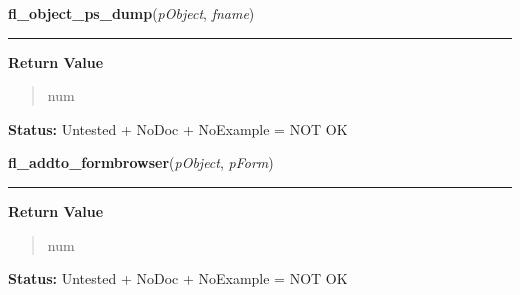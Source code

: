     \vspace{0.5ex}

\hspace{.8\funcindent}\begin{boxedminipage}{\funcwidth}

    \raggedright \textbf{fl\_object\_ps\_dump}(\textit{pObject}, \textit{fname})

    \vspace{-1.5ex}

    \rule{\textwidth}{0.5\fboxrule}
\setlength{\parskip}{2ex}
\setlength{\parskip}{1ex}
      \textbf{Return Value}
    \vspace{-1ex}

      \begin{quote}
      num

      \end{quote}

\textbf{Status:} Untested + NoDoc + NoExample = NOT OK



    \end{boxedminipage}

    \label{xformslib:library:fl_addto_formbrowser}

    \vspace{0.5ex}

\hspace{.8\funcindent}\begin{boxedminipage}{\funcwidth}

    \raggedright \textbf{fl\_addto\_formbrowser}(\textit{pObject}, \textit{pForm})

    \vspace{-1.5ex}

    \rule{\textwidth}{0.5\fboxrule}
\setlength{\parskip}{2ex}
\setlength{\parskip}{1ex}
      \textbf{Return Value}
    \vspace{-1ex}

      \begin{quote}
      num

      \end{quote}

\textbf{Status:} Untested + NoDoc + NoExample = NOT OK



    \end{boxedminipage}

    \label{xformslib:library:fl_delete_formbrowser_bynumber}

